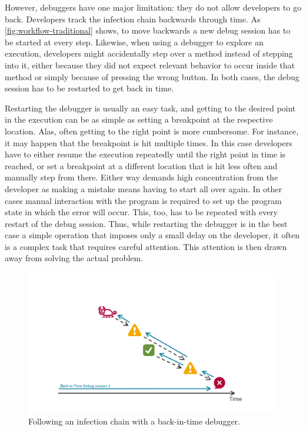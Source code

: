 However, debuggers have one major limitation: they do not allow developers to go back.
Developers track the infection chain backwards through time.
As \cref{fig:workflow-traditional} shows, to move backwards a new debug session has to be started at every step.
Likewise, when using a debugger to explore an execution, developers might accidentally step over a method instead of stepping into it, either because they did not expect relevant behavior to occur inside that method or simply because of pressing the wrong button.
In both cases, the debug session has to be restarted to get back in time.

Restarting the debugger is usually an easy task, and getting to the desired point in the execution can be as simple as setting a breakpoint at the respective location.
Alas, often getting to the right point is more cumbersome.
For instance, it may happen that the breakpoint is hit multiple times.
In this case developers have to either resume the execution repeatedly until the right point in time is reached, or set a breakpoint at a different location that is hit less often and manually step from there.
Either way demands high concentration from the developer as making a mistake means having to start all over again.
In other cases manual interaction with the program is required to set up the program state in which the error will occur.
This, too, has to be repeated with every restart of the debug session.
Thus, while restarting the debugger is in the best case a simple operation that imposes only a small delay on the developer, it often is a complex task that requires careful attention.
This attention is then drawn away from solving the actual problem.

\begin{figure}[t]
\centering
\includegraphics[width=.9\linewidth]{img/workflow-odb}
\caption{Following an infection chain with a back-in-time debugger.}
\label{fig:workflow-odb}
\end{figure}

